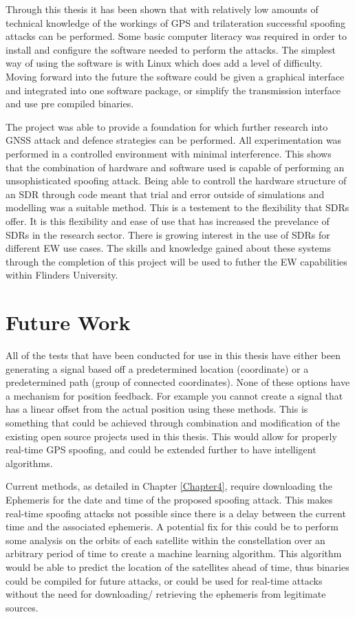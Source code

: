 \bigskip

Through this thesis it has been shown that with relatively low amounts of technical knowledge of the workings of GPS and trilateration successful spoofing attacks can be performed. Some basic computer literacy
was required in order to install and configure the software needed to perform the attacks. The simplest way of using the software is with Linux which does add a level of
difficulty.
Moving forward into the future the software could be given a graphical interface and integrated into one software package, or simplify the transmission interface and use
pre compiled binaries.

\bigskip

The project was able to provide a foundation for which further research into GNSS attack and defence strategies can be
performed. All experimentation was performed in a controlled environment with minimal interference. This shows that the combination of hardware and software used is
capable of performing an unsophisticated spoofing attack. Being able to controll the hardware structure of an SDR through code meant that trial and error outside of
simulations and modelling was a suitable method.
This is a testement to the flexibility that SDRs offer. It is this flexibility and ease of use that has increased the prevelance of SDRs in the research sector. There is
growing interest in the use of SDRs for different EW use cases. The skills and knowledge gained about these systems through the completion of this project will be used
to futher the EW capabilities within Flinders University.

\section{Future Work}
All of the tests that have been conducted for use in this thesis have either been generating a signal based off a predetermined location (coordinate) or a predetermined
path (group of connected coordinates). None of these options have a mechanism for position feedback. For example you cannot create a signal that has a linear offset from
the actual position using these methods. This is something that could be achieved through combination and modification of the existing open source projects used in this
thesis. This would allow for properly real-time GPS spoofing, and could be extended further to have intelligent algorithms.

Current methods, as detailed in Chapter \ref{Chapter4}, require downloading the Ephemeris for the date and time of the proposed spoofing attack. This makes real-time spoofing
attacks not possible since there is a delay between the current time and the associated ephemeris. A potential fix for this could be to perform some analysis on the
orbits of each satellite within the constellation over an arbitrary period of time to create a machine learning algorithm. This algorithm would be able to predict the
location of the satellites ahead of time, thus binaries could be compiled for future attacks, or could be used for real-time attacks without the need for downloading/
retrieving the ephemeris from legitimate sources.

